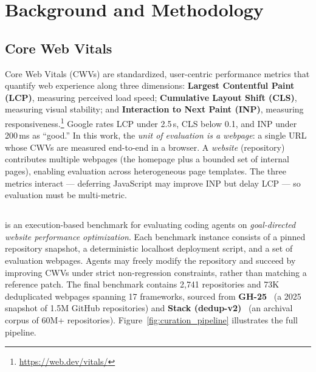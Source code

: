 \section{Background and Methodology}

\label{sec:background_cwv} 
\subsection{Core Web Vitals}
Core Web Vitals (CWVs) are standardized, user-centric performance metrics that quantify web experience along three dimensions: \textbf{Largest Contentful Paint (LCP)}, measuring perceived load speed; \textbf{Cumulative Layout Shift (CLS)}, measuring visual stability; and \textbf{Interaction to Next Paint (INP)}, measuring responsiveness.\footnote{\url{https://web.dev/vitals/}} Google rates LCP under 2.5\,s, CLS below 0.1, and INP under 200\,ms as ``good.'' In this work, the \emph{unit of evaluation is a webpage}: a single URL whose CWVs are measured end-to-end in a browser. A \emph{website} (repository) contributes multiple webpages (the homepage plus a bounded set of internal pages), enabling evaluation across heterogeneous page templates. The three metrics interact --- deferring JavaScript may improve INP but delay LCP --- so evaluation must be multi-metric.

\subsection{\OurBench}
\label{sec:bench_sources}

\OurBench is an execution-based benchmark for evaluating coding agents on \emph{goal-directed website performance optimization}. Each benchmark instance consists of a pinned repository snapshot, a deterministic localhost deployment script, and a set of evaluation webpages. Agents may freely modify the repository and succeed by improving CWVs under strict non-regression constraints, rather than matching a reference patch. The final benchmark contains 2{,}741 repositories and 73K deduplicated webpages spanning 17 frameworks, sourced from \textbf{GH-25}~\cite{nick007x_github_code_2025} (a 2025 snapshot of 1.5M GitHub repositories) and \textbf{Stack (dedup-v2)}~\cite{Kocetkov2022TheStack} (an archival corpus of 60M+ repositories). Figure~\ref{fig:curation_pipeline} illustrates the full pipeline.

